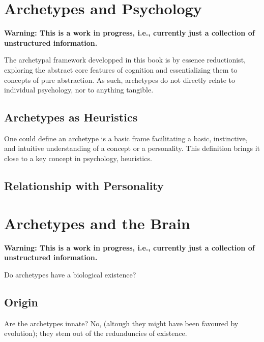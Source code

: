 \documentclass[]{book}
\begin{document}
\hypertarget{archetypes-and-psychology}{%
\chapter{Archetypes and Psychology}\label{archetypes-and-psychology}}

\textbf{Warning: This is a work in progress, i.e., currently just a collection of unstructured information.}

The archetypal framework developped in this book is by essence reductionist, exploring the abstract core features of cognition and essentializing them to concepts of pure abstraction. As such, archetypes do not directly relate to individual psychology, nor to anything tangible.

\hypertarget{archetypes-as-heuristics}{%
\section{Archetypes as Heuristics}\label{archetypes-as-heuristics}}

One could define an archetype is a basic frame facilitating a basic, instinctive, and intuitive understanding of a concept or a personality. This definition brings it close to a key concept in psychology, heuristics.

\hypertarget{relationship-with-personality}{%
\section{Relationship with Personality}\label{relationship-with-personality}}

\hypertarget{archetypes-and-the-brain}{%
\chapter{Archetypes and the Brain}\label{archetypes-and-the-brain}}

\textbf{Warning: This is a work in progress, i.e., currently just a collection of unstructured information.}

Do archetypes have a biological existence?

\hypertarget{origin}{%
\section{Origin}\label{origin}}

Are the archetypes innate? No, (altough they might have been favoured by evolution); they stem out of the redunduncies of existence.
\end{document}
